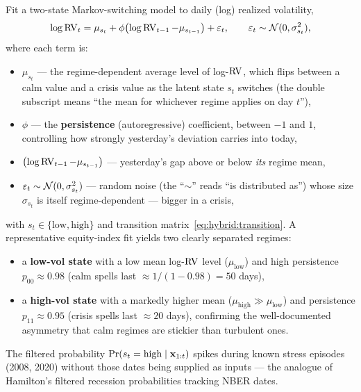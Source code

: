 \begin{keyresult}
Fit a two-state Markov-switching model to daily (log) realized volatility,
\begin{equation}\label{eq:hybrid:ms-rv}
  \log \operatorname{RV}_t = \mu_{s_t} + \phi\bigl(\log \operatorname{RV}_{t-1} - \mu_{s_{t-1}}\bigr)
    + \varepsilon_t,
  \qquad \varepsilon_t \sim \mathcal{N}(0, \sigma_{s_t}^2),
\end{equation}
where each term is:
\begin{itemize}
  \item $\mu_{s_t}$ --- the regime-dependent average level of log-$\operatorname{RV}$,
        which flips between a calm value and a crisis value as the latent
        state $s_t$ switches (the double subscript means ``the mean for
        whichever regime applies on day $t$''),
  \item $\phi$ --- the \textbf{persistence} (autoregressive) coefficient,
        between $-1$ and $1$, controlling how strongly yesterday's deviation
        carries into today,
  \item $\bigl(\log \operatorname{RV}_{t-1} - \mu_{s_{t-1}}\bigr)$ --- yesterday's gap
        above or below \emph{its} regime mean,
  \item $\varepsilon_t \sim \mathcal{N}(0,\sigma_{s_t}^2)$ --- random noise (the
        ``$\sim$'' reads ``is distributed as'') whose size $\sigma_{s_t}$
        is itself regime-dependent --- bigger in a crisis,
\end{itemize}
with $s_t \in \{\text{low},\text{high}\}$ and transition
matrix~\eqref{eq:hybrid:transition}.  A representative equity-index fit
yields two clearly separated regimes:
\begin{itemize}
  \item a \textbf{low-vol state} with a low mean log-$\operatorname{RV}$ level
        ($\mu_{\text{low}}$) and high persistence
        $p_{00} \approx 0.98$ (calm spells last $\approx 1/(1-0.98) = 50$
        days),
  \item a \textbf{high-vol state} with a markedly higher mean
        ($\mu_{\text{high}} \gg \mu_{\text{low}}$) and persistence
        $p_{11} \approx 0.95$ (crisis spells last $\approx 20$ days),
        confirming the well-documented asymmetry that calm regimes are
        stickier than turbulent ones.
\end{itemize}
The filtered probability $\Pr(s_t = \text{high} \mid \mathbf{x}_{1:t})$ spikes
during known stress episodes (2008, 2020) without those dates being
supplied as inputs --- the analogue of Hamilton's filtered recession
probabilities tracking NBER dates.
\end{keyresult}

